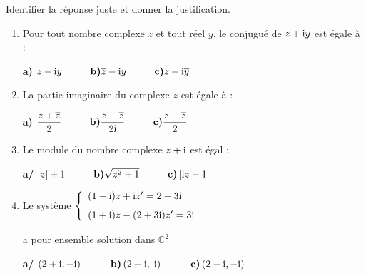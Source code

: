 \begin{exercice}
Identifier la réponse juste et donner la justification.
\begin{enumerate}
\item Pour tout nombre complexe $ z $ et tout réel $ y $, le conjugué de $z + \text{i} y$ est égale à :


\textbf{a)} $ z -\text{i} y \hspace*{1cm}\textbf{b)} \overline{z} - \text{i} y \hspace*{1cm} \textbf{c)} z - \text{i} \overline{y} $
\item La partie imaginaire du  complexe $ z $ est égale à :


\textbf{a)} $ \dfrac{z+ \overline{z}}{2} \hspace*{1cm} \textbf{b)} \dfrac{z- \overline{z}}{2\text{i}} \hspace*{1cm} \textbf{c)} \dfrac{z- \overline{z}}{2}$

\item   Le module  du  nombre complexe  $ z+\text{i}$  est  égal :


\textbf{a/\;\;} $ \left\lvert z \right\rvert +1 \hspace*{1cm} \textbf{b)} \sqrt{z^{2}+1} \hspace*{1cm} \textbf{c)} \left\lvert \text{i} z-1 \right\rvert $

\medskip 
\item Le système $ \left\{\begin{array}{l c l}
(1-\text{i})z +\text{i} z'=2-3\text{i} \\[0.25cm] 	 
 (1+\text{i})z -(2+3\text{i}) z'=3\text{i}
\end{array}\right. $


\medskip 
 a pour ensemble solution dans $ \mathbb{C}^2 $
 
 
 \medskip 
 \textbf{a/\;\;} $ \left(2+\text{i}, -\text{i}\right) \hspace*{1cm} \textbf{b)} \left(2+\text{i}, \;\text{i}\right) \hspace*{1cm} \textbf{c)} \left(2-\text{i}, -\text{i}\right) $ 

\end{enumerate}
\end{exercice}

